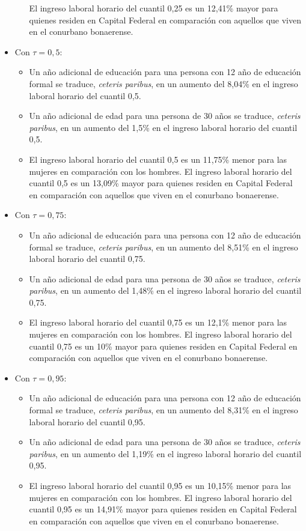 \documentclass[12pt]{article}
\begin{document}
\begin{itemize}
\begin{itemize}
        El ingreso laboral horario del cuantil 0,25 es un 12,41\% mayor para quienes residen en Capital Federal en comparación con aquellos que viven en el conurbano bonaerense.
    \end{itemize}
    \item Con $\tau=0,5$:
    \begin{itemize}
        \item Un año adicional de educación para una persona con 12 año de educación formal se traduce, \emph{ceteris paribus}, en un aumento del 8,04\% en el ingreso laboral horario del cuantil 0,5.
        \item Un año adicional de edad para una persona de 30 años se traduce, \emph{ceteris paribus}, en un aumento del 1,5\% en el ingreso laboral horario del cuantil 0,5.
        \item El ingreso laboral horario del cuantil 0,5 es un 11,75\% menor para las mujeres en comparación con los hombres.
        El ingreso laboral horario del cuantil 0,5 es un 13,09\% mayor para quienes residen en Capital Federal en comparación con aquellos que viven en el conurbano bonaerense.
    \end{itemize}
    \item Con $\tau=0,75$:
    \begin{itemize}
        \item Un año adicional de educación para una persona con 12 año de educación formal se traduce, \emph{ceteris paribus}, en un aumento del 8,51\% en el ingreso laboral horario del cuantil 0,75.
        \item Un año adicional de edad para una persona de 30 años se traduce, \emph{ceteris paribus}, en un aumento del 1,48\% en el ingreso laboral horario del cuantil 0,75.
        \item El ingreso laboral horario del cuantil 0,75 es un 12,1\% menor para las mujeres en comparación con los hombres.
        El ingreso laboral horario del cuantil 0,75 es un 10\% mayor para quienes residen en Capital Federal en comparación con aquellos que viven en el conurbano bonaerense.
    \end{itemize}
    \item Con $\tau=0,95$:
    \begin{itemize}
        \item Un año adicional de educación para una persona con 12 año de educación formal se traduce, \emph{ceteris paribus}, en un aumento del 8,31\% en el ingreso laboral horario del cuantil 0,95.
        \item Un año adicional de edad para una persona de 30 años se traduce, \emph{ceteris paribus}, en un aumento del 1,19\% en el ingreso laboral horario del cuantil 0,95.
        \item El ingreso laboral horario del cuantil 0,95 es un 10,15\% menor para las mujeres en comparación con los hombres.
        El ingreso laboral horario del cuantil 0,95 es un 14,91\% mayor para quienes residen en Capital Federal en comparación con aquellos que viven en el conurbano bonaerense.
    \end{itemize}
\end{itemize}
\end{document}
